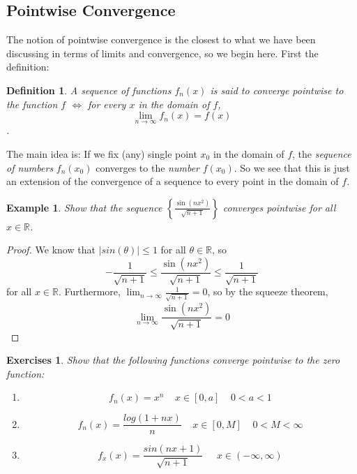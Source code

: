 \documentclass[12pt,a4paper]{article} %
\newtheorem{defn}{Definition}
\newtheorem{example}{Example}
\newtheorem{exer}{Exercises}
\begin{document}
\subsection{Pointwise Convergence}
The notion of pointwise convergence is the closest to what we have been discussing in terms of limits and convergence, so we begin here.  First the definition:
\begin{defn}
A sequence of functions $f_n(x)$ is said to \emph{converge pointwise} to the function $f$ $\iff$ for every $x$ in the domain of $f$, $$\lim_{n\rightarrow\infty} f_n(x) = f(x)$$.
\end{defn}
The main idea is: If we fix (any) single point $x_0$ in the domain of $f$, the \emph{sequence of numbers} $f_n(x_0)$ converges to the \emph{number} $f(x_0)$.  So we see that this is just an extension of the convergence of a sequence to every point in the domain of $f$.
\begin{example}
Show that the sequence $\left\{\frac{\sin(nx^2)}{\sqrt{n+1}}\right\}$ converges pointwise for all $x\in\mathbb{R}$.
\end{example}
\begin{proof}
We know that $|sin(\theta)|\leq 1$ for all $\theta\in\mathbb{R}$, so
$$-\frac{1}{\sqrt{n+1}}\leq\frac{\sin(nx^2)}{\sqrt{n+1}}\leq\frac{1}{\sqrt{n+1}}$$
for all $x\in\mathbb{R}$.  Furthermore, $\lim_{n\rightarrow\infty}\frac{1}{\sqrt{n+1}} = 0$, so by the squeeze theorem, 
$$\lim_{n\rightarrow\infty}\frac{\sin(nx^2)}{\sqrt{n+1}}=0$$
\end{proof}
\begin{exer}
Show that the following functions converge pointwise to the zero function:
\end{exer}
\begin{enumerate}
\item 
$$f_n(x) = x^n \;\;\;\; x\in [0,a] \;\;\;\; 0<a<1$$
\item $$f_n(x) = \frac{log(1+nx)}n\;\;\;\;x\in[0,M]\;\;\;\;0<M<\infty$$
\item $$f_x(x) = \frac{sin(nx+1)}{\sqrt{n+1}}\;\;\;\;\;x\in (-\infty,\infty)$$ 
\end{enumerate}
\end{document}
